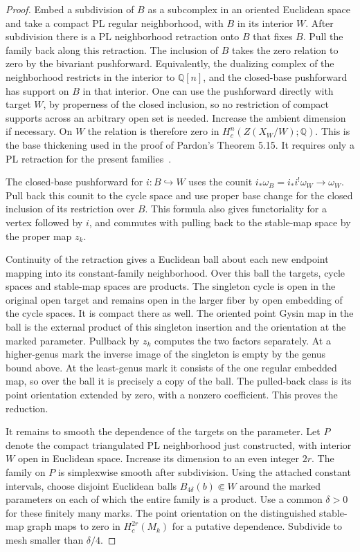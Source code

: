 \begin{proof}
Embed a subdivision of $B$ as a subcomplex in an oriented Euclidean
space and take a compact PL regular neighborhood, with $B$ in its
interior $W$. After subdivision there is a PL neighborhood retraction
onto $B$ that fixes $B$. Pull the family back along this retraction. The inclusion
of $B$ takes the zero relation to zero by the bivariant pushforward.
Equivalently, the dualizing complex of the neighborhood restricts
in the interior to $\mathbb Q[n]$, and the closed-base pushforward
has support on $B$ in that interior. One can use the pushforward
directly with target $W$, by properness of the closed inclusion,
so no restriction of compact supports across an arbitrary open set
is needed. Increase the ambient dimension if necessary. On $W$
the relation is therefore zero in $H_c^n(Z(X_W/W);\mathbb Q)$.
This is the base thickening used in the proof of Pardon's Theorem
5.15. It requires only a PL retraction for the present families~\cite[proof of Theorem 5.15]{Pardon}.

The closed-base pushforward for $i:B\hookrightarrow W$
uses the counit $i_*\omega_B=i_*i^!\omega_W\to\omega_W$.
Pull back this counit to the cycle space and use proper base change
for the closed inclusion of its restriction over $B$. This formula
also gives functoriality for a vertex followed by $i$, and commutes
with pulling back to the stable-map space by the proper map $z_k$.

Continuity of the retraction gives a Euclidean ball about each new
endpoint mapping into its constant-family neighborhood. Over this
ball the targets, cycle spaces and stable-map spaces are products.
The singleton cycle is open in the original open target and remains
open in the larger fiber by open embedding of the cycle spaces.
It is compact there as well. The oriented point Gysin map in the
ball is the external product of this singleton insertion and the
orientation at the marked parameter. Pullback by $z_k$ computes
the two factors separately. At a higher-genus mark the inverse image
of the singleton is empty by the genus bound above. At the least-genus mark it consists
of the one regular embedded map, so over the ball it is precisely
a copy of the ball. The pulled-back class is its point orientation
extended by zero, with a nonzero coefficient. This proves the reduction.

It remains to smooth the dependence of the targets on the parameter.
Let $P$ denote the compact triangulated PL neighborhood just constructed,
with interior $W$ open in Euclidean space. Increase its dimension to
an even integer $2r$. The family on $P$ is simplexwise smooth after
subdivision. Using the attached constant intervals, choose
disjoint Euclidean balls $B_{4\delta}(b)\Subset W$ around the
marked parameters on each of which the entire family is a product.
Use a common $\delta>0$ for these finitely many marks. The point
orientation on the distinguished stable-map graph maps to zero in
$H_c^{2r}(M_k)$ for a putative dependence. Subdivide to mesh
smaller than $\delta/4$.


\end{proof}
